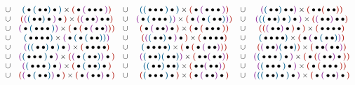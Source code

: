 \documentclass[twoside, 12pt]{amsart}
\theoremstyle{remark}
\begin{document}
\begin{equation*}
\begin{matrix}
      & \cup & \blue{\bullet \blue{\bullet \bullet} \bullet} \times \red{\bullet \purple{\bullet\bullet \bullet}}
      & \cup & \blue{\blue{\bullet \bullet \bullet}\bullet} \times \red{\bullet \purple{\bullet \bullet \bullet}}
      & \cup & \purple{\blue{\bullet \bullet}\bullet \bullet} \times \red{\bullet \bullet\red{\bullet \bullet}} \\
      & \cup & \red{\purple{\blue{\bullet \bullet}\bullet}\bullet} \times \red{\purple{\bullet \bullet}\bullet \bullet}
      & \cup & \purple{\bullet \blue{\bullet \bullet \bullet}} \times \red{\bullet \purple{\bullet \blue{\bullet \bullet}}}
      & \cup & \purple{\blue{\blue{\bullet \bullet}\bullet}\bullet} \times \red{\purple{\bullet \bullet}\bullet \bullet} \\
      & \cup & \purple{\bullet \blue{\bullet \bullet \bullet}} \times \red{\bullet \red{ \bullet \purple{\bullet \bullet}}} 
      & \cup & \red{\bullet \purple{\bullet \bullet}\bullet} \times \red{\bullet \red{\bullet \bullet \bullet}}
      & \cup & \red{\red{\purple{\bullet \bullet}\bullet }\bullet} \times \red{\bullet \bullet \bullet \bullet} \\
      & \cup & \blue{\bullet \bullet \bullet \bullet} \times \purple{\bullet \blue{\bullet\blue{\bullet \bullet}}} 
      & \cup &   \red{\purple{\blue{\bullet \bullet}\bullet}\bullet} \times \red{\bullet \bullet \bullet \bullet} 
      & \cup & \blue{\bullet \bullet \bullet \bullet} \times \red{\bullet \purple{\bullet \blue{\bullet \bullet}}} \\
      & \cup & \purple{\blue{\blue{\bullet \bullet}\bullet}\bullet} \times \red{\bullet \bullet \bullet \bullet} 
      & \cup & \blue{\bullet \bullet \bullet \bullet} \times \red{\bullet\red{\bullet\purple{\bullet \bullet}}} 
      & \cup & \red{\purple{\bullet \bullet}\blue{\bullet \bullet}} \times \red{\bullet \bullet \purple{\bullet \bullet}} \\
      & \cup & \purple{\blue{\bullet \bullet \bullet}\bullet} \times \red{\purple{\bullet \blue{\bullet \bullet}}\bullet}
      & \cup & \purple{\blue{\bullet \bullet}\blue{\bullet \bullet}} \times \red{\bullet \bullet \purple{\bullet \bullet}}
      & \cup & \purple{\blue{\bullet \bullet \bullet}\bullet} \times \red{\bullet \red{\purple{\bullet \bullet}\bullet}} \\ %
      & \cup & \purple{\blue{\bullet \bullet \bullet}\bullet} \times \red{\bullet \blue{\bullet \bullet}\bullet} %
      & \cup & \blue{\blue{\bullet \bullet}\bullet \bullet} \times \red{\bullet \bullet\purple{\bullet \bullet}}
      & \cup & \purple{\blue{\bullet \bullet \bullet}\bullet} \times \red{\bullet \red{\bullet \bullet \bullet}} \\
      & \cup & \red{\purple{\bullet \blue{\bullet \bullet}}\bullet} \times \red{\bullet \purple{\bullet \bullet}\bullet}
      & \cup & \red{\blue{\bullet \bullet \bullet}\bullet} \times \red{\bullet \purple{\bullet \bullet}\bullet}  %
      & \cup & \purple{\blue{\blue{\bullet \bullet}\bullet}\bullet} \times \red{\bullet \purple{\bullet \bullet}\bullet} %
  \end{matrix}
\end{equation*}
\end{document}
